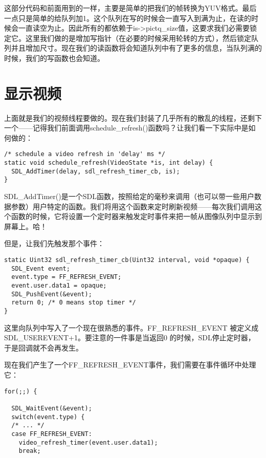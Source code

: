 这部分代码和前面用到的一样，主要是简单的把我们的帧转换为YUV格式。最后一点只是简单的给队列加1。这个队列在写的时候会一直写入到满为止，在读的时候会一直读空为止。因此所有的都依赖于is->pictq_size值，这要求我们必需要锁定它。这里我们做的是增加写指针（在必要的时候采用轮转的方式），然后锁定队列并且增加尺寸。现在我们的读函数将会知道队列中有了更多的信息，当队列满的时候，我们的写函数也会知道。

\section{显示视频}
上面就是我们的视频线程要做的。现在我们封装了几乎所有的散乱的线程，还剩下一个——记得我们前面调用schedule_refresh()函数吗？让我们看一下实际中是如何做的：

\begin{lstlisting}
/* schedule a video refresh in 'delay' ms */
static void schedule_refresh(VideoState *is, int delay) {
  SDL_AddTimer(delay, sdl_refresh_timer_cb, is);
}
\end{lstlisting}

SDL_AddTimer()是一个SDL函数，按照给定的毫秒来调用（也可以带一些用户数据参数）用户特定的函数。我们将用这个函数来定时刷新视频——每次我们调用这个函数的时候，它将设置一个定时器来触发定时事件来把一帧从图像队列中显示到屏幕上。哈！

但是，让我们先触发那个事件：
\begin{lstlisting}
static Uint32 sdl_refresh_timer_cb(Uint32 interval, void *opaque) {
  SDL_Event event;
  event.type = FF_REFRESH_EVENT;
  event.user.data1 = opaque;
  SDL_PushEvent(&event);
  return 0; /* 0 means stop timer */
}
\end{lstlisting}

这里向队列中写入了一个现在很熟悉的事件。FF_REFRESH_EVENT 被定义成SDL_USEREVENT+1。要注意的一件事是当返回0 的时候，SDL停止定时器，于是回调就不会再发生。

现在我们产生了一个FF_REFRESH_EVENT事件，我们需要在事件循环中处理它：
\begin{lstlisting}
for(;;) {

  SDL_WaitEvent(&event);
  switch(event.type) {
  /* ... */
  case FF_REFRESH_EVENT:
    video_refresh_timer(event.user.data1);
    break;
\end{lstlisting}

